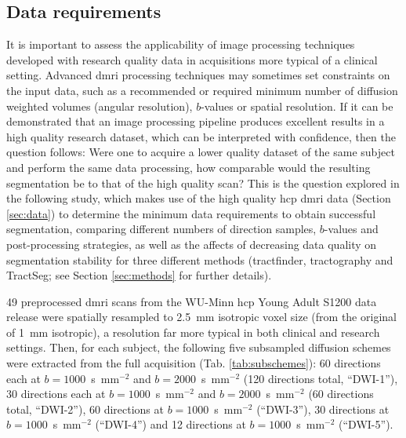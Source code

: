\subsection{Data requirements}\label{sec:ismrmdiff}

It is important to assess the applicability of image processing techniques developed with research quality data in acquisitions more typical of a clinical setting.
Advanced \gls{dmri} processing techniques may sometimes set constraints on the input data, such as a recommended or required minimum number of diffusion weighted volumes (angular resolution), $b$-values or spatial resolution.
If it can be demonstrated that an image processing pipeline produces excellent results in a high quality research dataset, which can be interpreted with confidence, then the question follows:
Were one to acquire a lower quality dataset of the same subject and perform the same data processing, how comparable would the resulting segmentation be to that of the high quality scan?
This is the question explored in the following study, which makes use of the high quality \gls{hcp} \gls{dmri} data (Section \ref{sec:data}) to determine the minimum data requirements to obtain successful segmentation, comparing different numbers of direction samples, $b$-values and post-processing strategies, as well as the affects of decreasing data quality on segmentation stability for three different methods (tractfinder, tractography and TractSeg; see Section \ref{sec:methods} for further details).


49 preprocessed \gls{dmri} scans from the WU-Minn \gls{hcp} Young Adult S1200 data release were spatially resampled to 2.5~mm isotropic voxel size (from the original of 1~mm isotropic), a resolution far more typical in both clinical and research settings.
Then, for each subject, the following five subsampled diffusion schemes were extracted from the full acquisition (Tab. \ref{tab:subschemes}):
60 directions each at $b=1000$~s~mm$^{-2}$ and $b=2000$~s~mm$^{-2}$ (120 directions total, ``DWI-1”), 30 directions each at $b=1000$~s~mm$^{-2}$ and $b=2000$~s~mm$^{-2}$ (60 directions total, ``DWI-2”), 60 directions at $b=1000$~s~mm$^{-2}$ (``DWI-3”), 30 directions at $b=1000$~s~mm$^{-2}$ (``DWI-4”) and 12 directions at $b=1000$~s~mm$^{-2}$ (``DWI-5”).

